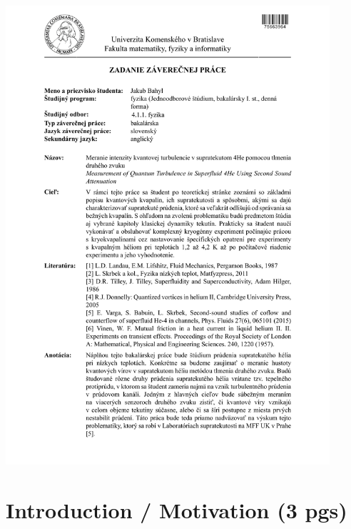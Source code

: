 \documentclass[a4paper, 12pt]{report}
\newcommand{\<}{\langle} %
\renewcommand{\>}{\rangle} %
\begin{document}
\includegraphics[width=0.9\textwidth]{docs/zadanie_Bahyl_SVK.pdf}
\newpage




\newpage


\pagestyle{plain}
\setcounter{page}{1}

\tableofcontents

%
%
%
%
%

\chapter*{Introduction / Motivation (3 pgs)}
\end{document}
